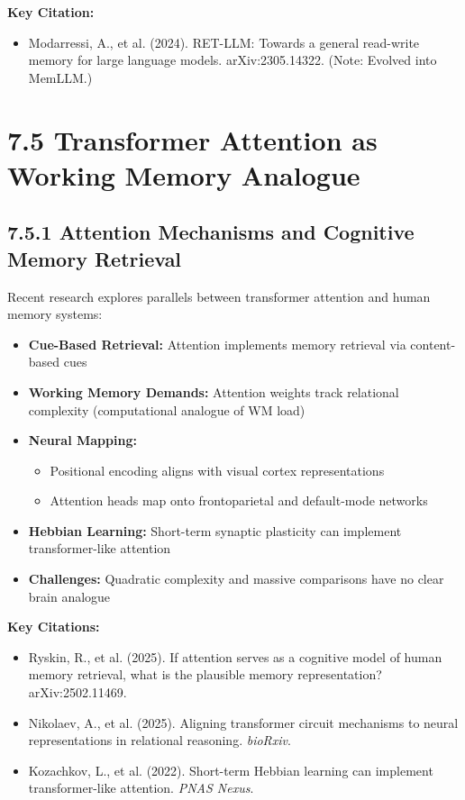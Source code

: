 \documentclass[11pt,letterpaper]{article}
\begin{document}
\textbf{Key Citation:}
\begin{itemize}[leftmargin=*]
    \item Modarressi, A., et al. (2024). RET-LLM: Towards a general read-write memory for large language models. arXiv:2305.14322. (Note: Evolved into MemLLM.)
\end{itemize}

\section{\color{garnet}7.5 Transformer Attention as Working Memory Analogue}

\subsection{7.5.1 Attention Mechanisms and Cognitive Memory Retrieval}

Recent research explores parallels between transformer attention and human memory systems:

\begin{itemize}[leftmargin=*]
    \item \textbf{Cue-Based Retrieval:} Attention implements memory retrieval via content-based cues
    \item \textbf{Working Memory Demands:} Attention weights track relational complexity (computational analogue of WM load)
    \item \textbf{Neural Mapping:}
    \begin{itemize}
        \item Positional encoding aligns with visual cortex representations
        \item Attention heads map onto frontoparietal and default-mode networks
    \end{itemize}
    \item \textbf{Hebbian Learning:} Short-term synaptic plasticity can implement transformer-like attention
    \item \textbf{Challenges:} Quadratic complexity and massive comparisons have no clear brain analogue
\end{itemize}

\textbf{Key Citations:}
\begin{itemize}[leftmargin=*]
    \item Ryskin, R., et al. (2025). If attention serves as a cognitive model of human memory retrieval, what is the plausible memory representation? arXiv:2502.11469.
    \item Nikolaev, A., et al. (2025). Aligning transformer circuit mechanisms to neural representations in relational reasoning. \textit{bioRxiv}.
    \item Kozachkov, L., et al. (2022). Short-term Hebbian learning can implement transformer-like attention. \textit{PNAS Nexus}.
\end{itemize}
\end{document}

